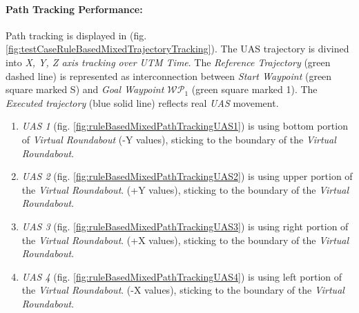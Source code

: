     
    \paragraph{Path Tracking Performance:} Path tracking is displayed in (fig. \ref{fig:testCaseRuleBasedMixedTrajectoryTracking}). The UAS trajectory is divined into \emph{X, Y, Z axis tracking over UTM Time}. The \emph{Reference Trajectory} (green dashed line) is represented as interconnection between \emph{Start Waypoint} (green square marked S) and  \emph{Goal Waypoint $\mathscr{WP}_1$} (green square marked 1). The \emph{Executed trajectory} (blue solid line) reflects real \emph{UAS} movement.
    
    \begin{enumerate}
        \item \emph{UAS 1} (fig. \ref{fig:ruleBasedMixedPathTrackingUAS1}) is using bottom portion of \emph{Virtual Roundabout} (-Y values), sticking to the boundary of the \emph{Virtual Roundabout}.
        
        \item \emph{UAS 2} (fig. \ref{fig:ruleBasedMixedPathTrackingUAS2}) is using upper portion of the \emph{Virtual Roundabout}. (+Y values), sticking to the boundary of the \emph{Virtual Roundabout}.
        
        \item \emph{UAS 3} (fig. \ref{fig:ruleBasedMixedPathTrackingUAS3}) is using right portion of the \emph{Virtual Roundabout}. (+X values), sticking to the boundary of the \emph{Virtual Roundabout}.
        
        \item \emph{UAS 4} (fig. \ref{fig:ruleBasedMixedPathTrackingUAS4}) is using left portion of the \emph{Virtual Roundabout}. (-X values), sticking to the boundary of the \emph{Virtual Roundabout}.
    \end{enumerate}
    
